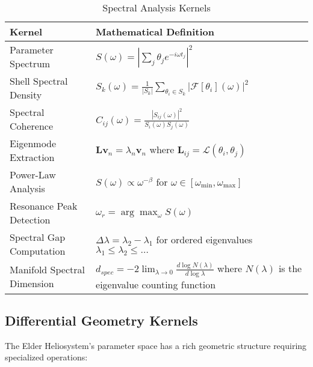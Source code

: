 \begin{table}[h]
\centering
\small
\caption{Spectral Analysis Kernels}
\label{tab:spectral_kernels}
\begin{tabular}{|p{5cm}|p{9cm}|}
\hline
\textbf{Kernel} & \textbf{Mathematical Definition} \\
\hline
Parameter Spectrum & $S(\omega) = \left| \sum_j \theta_j e^{-i\omega t_j} \right|^2$ \\
\hline
Shell Spectral Density & $S_k(\omega) = \frac{1}{|S_k|} \sum_{\theta_i \in S_k} |\mathcal{F}[\theta_i](\omega)|^2$ \\
\hline
Spectral Coherence & $C_{ij}(\omega) = \frac{|S_{ij}(\omega)|^2}{S_i(\omega)S_j(\omega)}$ \\
\hline
Eigenmode Extraction & $\mathbf{L}\mathbf{v}_n = \lambda_n \mathbf{v}_n$ where $\mathbf{L}_{ij} = \mathcal{L}(\theta_i, \theta_j)$ \\
\hline
Power-Law Analysis & $S(\omega) \propto \omega^{-\beta}$ for $\omega \in [\omega_{\min}, \omega_{\max}]$ \\
\hline
Resonance Peak Detection & $\omega_r = \arg\max_{\omega} S(\omega)$ \\
\hline
Spectral Gap Computation & $\Delta\lambda = \lambda_2 - \lambda_1$ for ordered eigenvalues $\lambda_1 \leq \lambda_2 \leq \ldots$ \\
\hline
Manifold Spectral Dimension & $d_{spec} = -2\lim_{\lambda \to 0} \frac{d\log N(\lambda)}{d\log \lambda}$ where $N(\lambda)$ is the eigenvalue counting function \\
\hline
\end{tabular}
\end{table}

\subsection{Differential Geometry Kernels}

The Elder Heliosystem's parameter space has a rich geometric structure requiring specialized operations:

